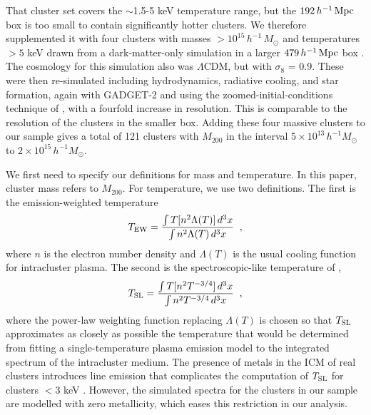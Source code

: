 \documentclass{aastex} \usepackage{natbib}
\begin{document}
That cluster set covers the $\sim$1.5-5 keV temperature range, but the
$192 \, h^{-1} \, {\rm Mpc}$ box is too small to contain significantly
hotter clusters.  We therefore supplemented it with four clusters with
masses $> 10^{15} \, h^{-1} \, M_\odot$ and temperatures $> 5$ keV
drawn from a dark-matter-only simulation in a larger $479 \, h^{-1} \,
{\rm Mpc}$ box \citep{2006MNRAS.373..397S}.  The cosmology for this
simulation also was $\Lambda$CDM, but with $\sigma_8$ = 0.9.  These
were then re-simulated including hydrodynamics, radiative cooling, and
star formation, again with GADGET-2 and using the
zoomed-initial-conditions technique of \cite{1997MNRAS.290..411T},
with a fourfold increase in resolution.  This is comparable to the
resolution of the clusters in the smaller box.  Adding these four
massive clusters to our sample gives a total of 121 clusters with
$M_{200}$ in the interval $5 \times 10^{13} \, h^{-1} M_\odot$ to $2
\times 10^{15} \, h^{-1} M_\odot$.

We first need to specify our definitions for mass and temperature.  In
this paper, cluster mass refers to $M_{200}$.  For temperature, we use
two definitions.  The first is the emission-weighted temperature
\begin{equation}
  T_{\rm EW} = \frac { \int T [n^2 \Lambda(T) ] \, d^3 x } { \int n^2 \Lambda(T) \, d^3 x }  \; \; ,
\end{equation}
where $n$ is the electron number density and $\Lambda(T)$ is the usual
cooling function for intracluster plasma.  The second is the
spectroscopic-like temperature of \cite{2004astro.ph..4425M},
\begin{equation}
  T_{\rm SL} = \frac { \int T [n^2 T^{-3/4}]  \, d^3 x } { \int n^2 T^{-3/4} \,  d^3 x }  \; \; ,
\end{equation}
where the power-law weighting function replacing $\Lambda(T)$ is
chosen so that $T_{\rm SL}$ approximates as closely as possible the
temperature that would be determined from fitting a single-temperature
plasma emission model to the integrated spectrum of the intracluster
medium.  The presence of metals in the ICM of real clusters introduces
line emission that complicates the computation of $T_{\rm SL}$ for clusters
$<$3 keV \citep{2006ApJ...640..710V}.  However, the simulated spectra
for the clusters in our sample are modelled with zero metallicity,
which eases this restriction in our analysis.
\end{document}
